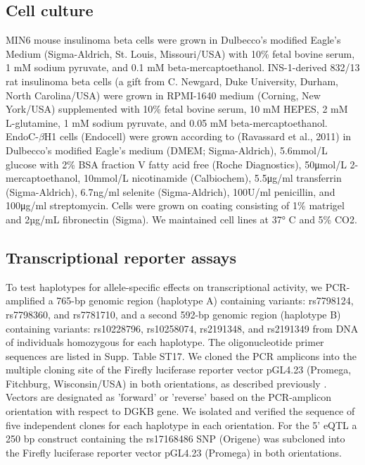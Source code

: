 \subsection{Cell culture}
MIN6 mouse insulinoma beta cells \cite{miyazakiEstablishmentPancreaticBeta1990} were grown in Dulbecco's modified Eagle's Medium (Sigma-Aldrich, St. Louis, Missouri/USA) with 10\% fetal bovine serum, 1 mM sodium pyruvate, and 0.1 mM beta-mercaptoethanol. INS-1-derived 832/13 rat insulinoma beta cells (a gift from C. Newgard, Duke University, Durham, North Carolina/USA) were grown in RPMI-1640 medium (Corning, New York/USA) supplemented with 10\% fetal bovine serum, 10 mM HEPES, 2 mM L-glutamine, 1 mM sodium pyruvate, and 0.05 mM beta-mercaptoethanol. EndoC-$\beta$H1 cells (Endocell) were grown according to (Ravassard et al., 2011) in Dulbecco's modified Eagle's medium (DMEM; Sigma-Aldrich), 5.6mmol/L glucose with 2\% BSA fraction V fatty acid free (Roche Diagnostics), 50μmol/L 2-mercaptoethanol, 10mmol/L nicotinamide (Calbiochem), 5.5μg/ml transferrin (Sigma-Aldrich), 6.7ng/ml selenite (Sigma-Aldrich), 100U/ml penicillin, and 100μg/ml streptomycin. Cells were grown on coating consisting of 1\% matrigel and 2µg/mL fibronectin (Sigma). We maintained cell lines at 37° C and 5\% CO2.

\subsection{Transcriptional reporter assays}
To test haplotypes for allele-specific effects on transcriptional activity, we PCR-amplified a 765-bp genomic region (haplotype A) containing variants: rs7798124, rs7798360, and rs7781710, and a second 592-bp genomic region (haplotype B) containing variants: rs10228796, rs10258074, rs2191348, and rs2191349 from DNA of individuals homozygous for each haplotype. The oligonucleotide primer sequences are listed in Supp. Table ST17. We cloned the PCR amplicons into the multiple cloning site of the Firefly luciferase reporter vector pGL4.23 (Promega, Fitchburg, Wisconsin/USA) in both orientations, as described previously \cite{fogartyIdentificationRegulatoryVariant2014}. Vectors are designated as 'forward' or 'reverse' based on the PCR-amplicon orientation with respect to DGKB gene. We isolated and verified the sequence of five independent clones for each haplotype in each orientation. For the 5' eQTL a 250 bp construct containing the rs17168486 SNP (Origene) was subcloned into the Firefly luciferase reporter vector pGL4.23 (Promega) in both orientations. \\

